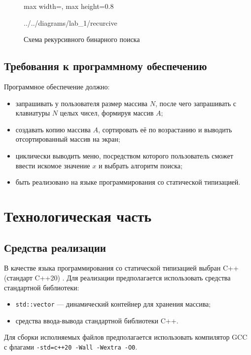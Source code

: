 \documentclass{bmstu}
\begin{document}
\begin{figure}[H]
	\centering
	\begin{adjustbox}{max width=\textwidth, max height=0.8\textheight}
		
		{../../diagrams/lab_1/recurcive}
	\end{adjustbox}
	\caption{Схема рекурсивного бинарного поиска}
	\label{fig:binary-search-recursive}
\end{figure}

\section{Требования к программному обеспечению}
Программное обеспечение должно:
\begin{itemize}
	\item запрашивать у пользователя размер массива $N$, после чего запрашивать
	      с клавиатуры $N$ целых чисел, формируя массив $A$;
	\item создавать копию массива $A$, сортировать её по возрастанию и выводить
	      отсортированный массив на экран;
	\item циклически выводить меню, посредством которого пользователь сможет
	      ввести искомое значение $x$ и выбрать алгоритм поиска;
	\item быть реализовано на языке программирования со статической типизацией.
\end{itemize}

\chapter{Технологическая часть}

\section{Средства реализации}
В качестве языка программирования со статической типизацией выбран C++
(стандарт C++20) \cite{cpp20}. Для реализации предполагается
использовать средства стандартной библиотеки:
\begin{itemize}
	\item \texttt{std::vector} --- динамический контейнер для хранения массива;
	\item средства ввода-вывода стандартной библиотеки C++.
\end{itemize}

Для сборки исполняемых файлов предполагается использовать компилятор GCC
с флагами \texttt{-std=c++20 -Wall -Wextra -O0}.
\end{document}
